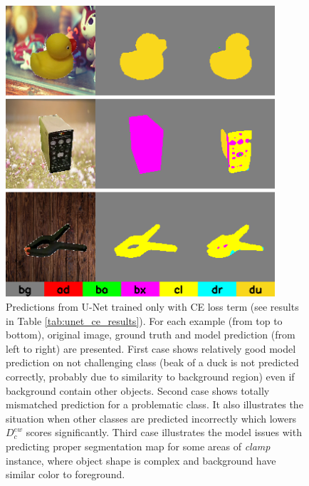 \documentclass{article}
\begin{document}
\begin{figure}
    \centering
  \includegraphics[width=10cm, keepaspectratio]{images/problematic_cases.png}
  \caption{Predictions from U-Net \cite{unet} trained only with CE loss term (see results in Table \ref{tab:unet_ce_results}). For each example (from top to bottom), original image, ground truth and model prediction (from left to right) are presented. First case shows relatively good model prediction on not challenging class (beak of a duck is not predicted correctly, probably due to similarity to background region) even if background contain other objects. Second case shows totally mismatched prediction for a problematic class. It also illustrates the situation when other classes are predicted incorrectly which lowers $D^{ew}_{c}$ scores significantly. Third case illustrates the model issues with predicting proper segmentation map for some areas of \textit{clamp} instance, where object shape is complex and background have similar color to foreground.}
  \label{fig:problematic_cases}
\end{figure}
\end{document}
